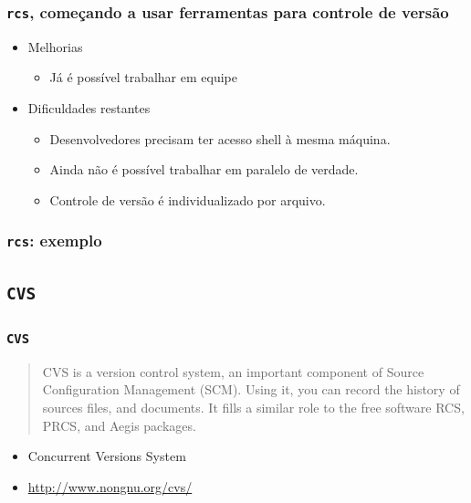\documentclass{beamer}
\newcommand{\rcs}{\texttt{rcs}}
\newcommand{\cvs}{\texttt{CVS}}
\begin{document}
\begin{frame}
  \frametitle{\rcs, começando a usar ferramentas para controle de versão}
  \begin{itemize}
    \item Melhorias
      \begin{itemize}
        \item Já é possível trabalhar em equipe
      \end{itemize}

    \item Dificuldades restantes
      \begin{itemize}
        \item Desenvolvedores precisam ter acesso shell à mesma máquina.
        \item Ainda não é possível trabalhar em paralelo de verdade.
        \item Controle de versão é individualizado por arquivo.
      \end{itemize}
  \end{itemize}
\end{frame}

\begin{frame}
  \frametitle{\rcs: exemplo}
  \begin{figure}[h]
    \begin{center}
    \end{center}
    \label{fig:rcs}
  \end{figure}
\end{frame}


\subsection{\cvs}

\begin{frame}
  \frametitle{\cvs}
  \begin{quote}
    CVS is a version control system, an important component of Source
    Configuration Management (SCM). Using it, you can record the history
    of sources files, and documents. It fills a similar role to the free
    software RCS, PRCS, and Aegis packages.
  \end{quote}

  \begin{itemize}
    \item Concurrent Versions System
    \item \url{http://www.nongnu.org/cvs/}
  \end{itemize}
\end{frame}
\end{document}
